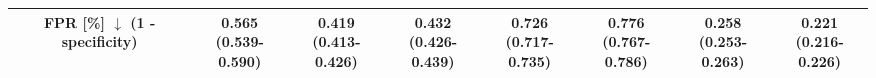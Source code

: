 \begin{frame}
\begin{table}
{\begin{tabular}{c|c|cc|cc|cc}
            \midrule
            \makecell[l]{\textbf{FPR} [\%] $\downarrow$ \\ (1 - specificity)} & \makecell[c]{0.565 \\ (0.539-0.590)} & \makecell[c]{0.419 \\ (0.413-0.426)} & \makecell[c]{0.432 \\ (0.426-0.439)} & \makecell[c]{0.726 \\ (0.717-0.735)} & \makecell[c]{0.776 \\ (0.767-0.786)} & \makecell[c]{0.258 \\ (0.253-0.263)} & \makecell[c]{0.221 \\ (0.216-0.226)} \\
    
            \bottomrule
        \end{tabular}%
        }
    \end{table}

\end{frame}


